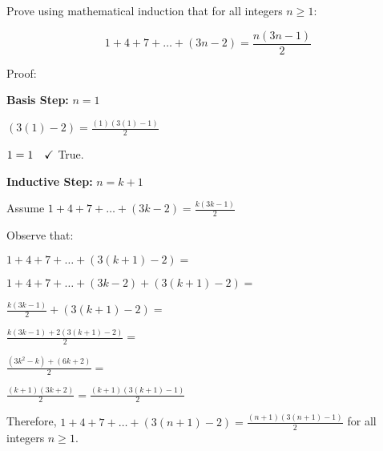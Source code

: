 \documentclass{article}
\newenvironment{Problem}
{\noindent\color{black}}
{\newline}
\newenvironment{Solution}
{\noindent\color{red}}
{\newline}
\begin{document}
\begin{Problem}
    Prove using mathematical induction that for all integers $n \geq 1$:

    $$1 + 4 + 7 + \dots + (3n - 2) = \frac{n(3n-1)}{2}$$
\end{Problem}


\begin{Solution}
    Proof:

    \phantom{ }

    \begin{adjustwidth}{2em}{0em}
        \textbf{Basis Step: } $n = 1$

        \phantom{ }

        \begin{adjustwidth}{2em}{0em}
            $\displaystyle (3(1) - 2) = \frac{(1)(3(1) - 1)}{2}$

            \phantom{ }

            $\displaystyle 1 = 1 \hspace*{1em} \checkmark$ True.
        \end{adjustwidth}

        \phantom{ }

        \textbf{Inductive Step: } $n = k + 1$

        \phantom{ }

        \begin{adjustwidth}{2em}{0em}
            Assume $\displaystyle 1 + 4 + 7 + \dots + (3k - 2) = \frac{k(3k-1)}{2}$
            
            \phantom{ }

            Observe that: 

            \phantom{ }

            $\displaystyle 1 + 4 + 7 + \dots + (3(k+1) - 2) = $

            \phantom{ }

            $\displaystyle 1 + 4 + 7 + \dots + (3k - 2) + (3(k+1) - 2) = $
            
            \phantom{ }

            $\displaystyle \frac{k(3k-1)}{2} + (3(k+1) - 2) = $

            \phantom{ }

            $\displaystyle \frac{k(3k-1) + 2(3(k+1)-2)}{2}= $

            \phantom{ }

            $\displaystyle \frac{(3k^2-k) + (6k+2)}{2}= $

            \phantom{ }

            $\displaystyle \frac{(k+1)(3k+2)}{2} = \frac{(k+1)(3(k+1)-1)}{2}$

        \end{adjustwidth}

        \phantom{ }

        Therefore, $\displaystyle 1 + 4 + 7 + \dots + (3(n+1) - 2) = \frac{(n+1)(3(n+1)-1)}{2}$
        for all integers $n \geq 1$.
    \end{adjustwidth}

    \phantom{ }
\end{Solution}
\end{document}
